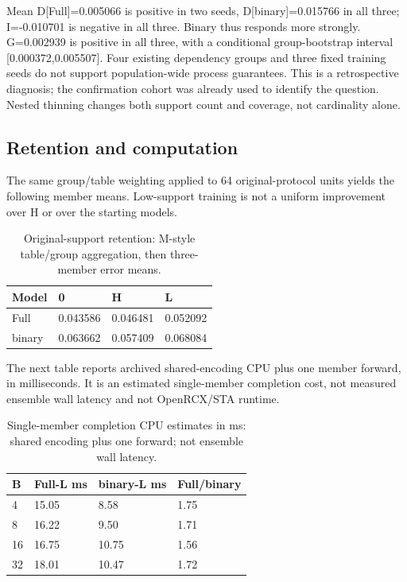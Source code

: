 \documentclass[10pt,twocolumn]{article}
\begin{document}
Mean D[Full]=0.005066 is positive in two seeds, D[binary]=0.015766 in all three; I=-0.010701 is negative in all three. Binary thus responds more strongly. G=0.002939 is positive in all three, with a conditional group-bootstrap interval [0.000372,0.005507]. Four existing dependency groups and three fixed training seeds do not support population-wide process guarantees. This is a retrospective diagnosis; the confirmation cohort was already used to identify the question. Nested thinning changes both support count and coverage, not cardinality alone.

\subsection*{Retention and computation}

The same group/table weighting applied to 64 original-protocol units yields the following member means. Low-support training is not a uniform improvement over H or over the starting models.

\begin{table}[t]\centering\small{\begin{tabular}{llll}\toprule
Model & 0 & H & L\\\midrule
Full & 0.043586 & 0.046481 & 0.052092\\
binary & 0.063662 & 0.057409 & 0.068084\\
\bottomrule\end{tabular}}\caption{Original-support retention: M-style table/group aggregation, then three-member error means.}\end{table}


The next table reports archived shared-encoding CPU plus one member forward, in milliseconds. It is an estimated single-member completion cost, not measured ensemble wall latency and not OpenRCX/STA runtime.

\begin{table}[t]\centering\small{\begin{tabular}{llll}\toprule
B & Full-L ms & binary-L ms & Full/binary\\\midrule
4 & 15.05 & 8.58 & 1.75\\
8 & 16.22 & 9.50 & 1.71\\
16 & 16.75 & 10.75 & 1.56\\
32 & 18.01 & 10.47 & 1.72\\
\bottomrule\end{tabular}}\caption{Single-member completion CPU estimates in ms: shared encoding plus one forward; not ensemble wall latency.}\end{table}
\end{document}
